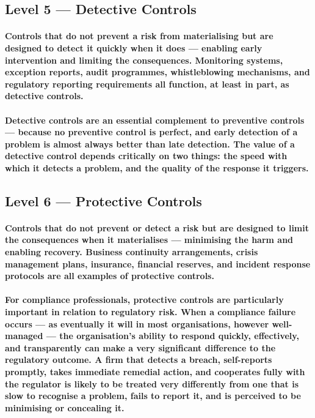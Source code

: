 \subsection{Level 5 — Detective Controls}
\paragraph{Controls that do not prevent a risk from materialising but are designed to detect it quickly when it does — enabling early intervention and limiting the consequences. Monitoring systems, exception reports, audit programmes, whistleblowing mechanisms, and regulatory reporting requirements all function, at least in part, as detective controls.}
\paragraph{Detective controls are an essential complement to preventive controls — because no preventive control is perfect, and early detection of a problem is almost always better than late detection. The value of a detective control depends critically on two things: the speed with which it detects a problem, and the quality of the response it triggers.}

\subsection{Level 6 — Protective Controls}
\paragraph{Controls that do not prevent or detect a risk but are designed to limit the consequences when it materialises — minimising the harm and enabling recovery. Business continuity arrangements, crisis management plans, insurance, financial reserves, and incident response protocols are all examples of protective controls.}
\paragraph{For compliance professionals, protective controls are particularly important in relation to regulatory risk. When a compliance failure occurs — as eventually it will in most organisations, however well-managed — the organisation's ability to respond quickly, effectively, and transparently can make a very significant difference to the regulatory outcome. A firm that detects a breach, self-reports promptly, takes immediate remedial action, and cooperates fully with the regulator is likely to be treated very differently from one that is slow to recognise a problem, fails to report it, and is perceived to be minimising or concealing it.}

